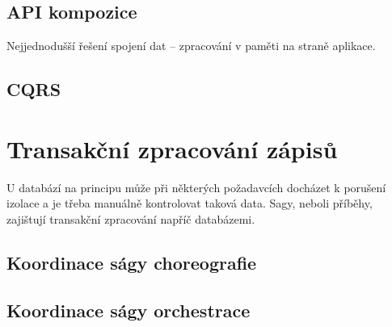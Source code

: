 \subsection{API kompozice}\label{subsec:msa-db-aggregate-api}

Nejjednodušší řešení spojení dat – zpracování v paměti na straně aplikace.


\subsection{CQRS}\label{subsec:msa-db-aggregate-cqrs}



\section{Transakční zpracování zápisů}\label{sec:msa-db-transaction}

U databází na principu  může při některých požadavcích docházet k porušení izolace a je třeba manuálně kontrolovat taková data.
Sagy, neboli příběhy, zajištují transakční zpracování napříč databázemi.



\subsection{Koordinace ságy choreografie}\label{subsec:msa-db-transaction-coordinate-choreography}



\subsection{Koordinace ságy orchestrace}\label{subsec:msa-db-transaction-coordinate-orchestration}
